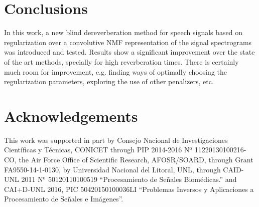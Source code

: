 \documentclass[12pt]{article}
\begin{document}
\section{Conclusions}

In this work, a new blind dereverberation method for speech signals based on regularization over a convolutive NMF representation of the signal spectrograms was introduced and tested. Results show a significant improvement over the state of the art methods, specially for high reverberation times. There is certainly much room for improvement, e.g. finding ways of optimally choosing the regularization parameters, exploring the use of other penalizers, etc.




\section*{Acknowledgements}

This work was supported in part by Consejo Nacional de Investigaciones Cient\'ificas y T\'ecnicas, CONICET  through PIP 2014-2016 N$^\text{o}$ 11220130100216-CO, \hspace{0.1cm} the Air Force Office of Scientific Research,  AFOSR/SOARD, through Grant FA9550-14-1-0130, by Universidad Nacional del Litoral, UNL, through CAID-UNL 2011 N$^\text{o}$ 50120110100519 ``Procesamiento de Se\~nales Biom\'edicas.'' and CAI+D-UNL 2016, PIC 50420150100036LI ``Problemas Inversos y Aplicaciones a Procesamiento de Se\~nales e Im\'agenes''.




 
 
\end{document}
